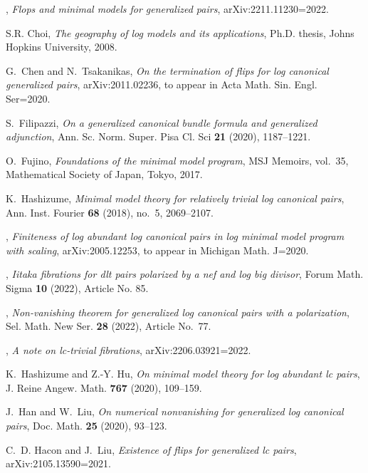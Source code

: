 \begin{thebibliography}{BCHM10}
\bysame, \emph{Flops and minimal models for generalized pairs},
  arXiv:2211.11230=\hbox{2022}.

S.R. Choi, \emph{The geography of log models and its applications}, Ph.D.
  thesis, Johns Hopkins University, 2008.

G.~Chen and N.~Tsakanikas, \emph{On the termination of flips for log canonical
  generalized pairs}, arXiv:2011.02236, to appear in Acta Math. Sin. Engl.
  Ser=\hbox{2020}.

S.~Filipazzi, \emph{On a generalized canonical bundle formula and generalized
  adjunction}, Ann. Sc. Norm. Super. Pisa Cl. Sci \textbf{21} (2020),
  1187--1221.

O.~Fujino, \emph{Foundations of the minimal model program}, MSJ Memoirs,
  vol.~35, Mathematical Society of Japan, Tokyo, 2017.

K.~Hashizume, \emph{Minimal model theory for relatively trivial log canonical
  pairs}, Ann. Inst. Fourier \textbf{68} (2018), no.~5, 2069--2107.

\bysame, \emph{Finiteness of log abundant log canonical pairs in log minimal
  model program with scaling}, arXiv:2005.12253, to appear in Michigan Math.
  J=\hbox{2020}.

\bysame, \emph{Iitaka fibrations for dlt pairs polarized by a nef and log big
  divisor}, Forum Math. Sigma \textbf{10} (2022), Article No. 85.

\bysame, \emph{Non-vanishing theorem for generalized log canonical pairs with a
  polarization}, Sel. Math. New Ser. \textbf{28} (2022), Article No.\ 77.

\bysame, \emph{A note on lc-trivial fibrations},
  arXiv:2206.03921=\hbox{2022}.

K.~Hashizume and Z.-Y. Hu, \emph{On minimal model theory for log abundant lc
  pairs}, J. Reine Angew. Math. \textbf{767} (2020), 109--159.

J.~Han and W.~Liu, \emph{On numerical nonvanishing for generalized log
  canonical pairs}, Doc. Math. \textbf{25} (2020), 93--123.

C.~D. Hacon and J.~Liu, \emph{Existence of flips for generalized lc pairs},
  arXiv:2105.13590=\hbox{2021}.


\end{thebibliography}
